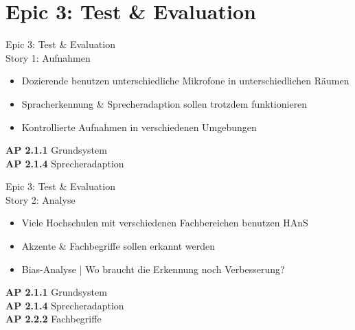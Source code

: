 \documentclass[aspectratio=169,xcolor=dvipsnames]{beamer}
\begin{document}
\section{Epic 3: Test \& Evaluation}

\begin{frame}{Epic 3: Test \& Evaluation \\ Story 1: Aufnahmen}
\begin{itemize}
    \item 
    Dozierende benutzen unterschiedliche Mikrofone in unterschiedlichen Räumen
    
    \item 
    Spracherkennung \& Sprecheradaption sollen trotzdem funktionieren
    
    \item 
    Kontrollierte Aufnahmen in verschiedenen Umgebungen

\end{itemize}
    
\vfill    
\scriptsize\textbf{AP 2.1.1} Grundsystem\\
\textbf{AP 2.1.4} Sprecheradaption
    
    
\end{frame}


\begin{frame}{Epic 3: Test \& Evaluation \\ Story 2: Analyse}

\begin{itemize}
    \item 
    Viele Hochschulen mit verschiedenen Fachbereichen benutzen HAnS
    
    \item 
    Akzente \& Fachbegriffe sollen erkannt werden
    
    \item 
    Bias-Analyse | Wo braucht die Erkennung noch Verbesserung?
    
\end{itemize}
\vfill    
\scriptsize\textbf{AP 2.1.1} Grundsystem\\
\textbf{AP 2.1.4} Sprecheradaption\\
\textbf{AP 2.2.2} Fachbegriffe
\end{frame}


\end{document}
